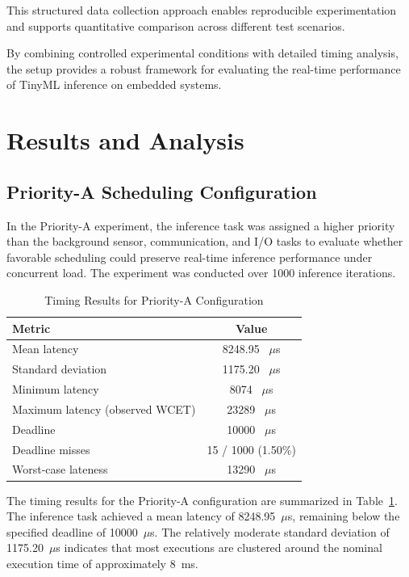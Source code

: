 \documentclass[conference]{IEEEtran}
\begin{document}
This structured data collection approach enables reproducible experimentation and supports quantitative comparison across different test scenarios.

By combining controlled experimental conditions with detailed timing analysis, the setup provides a robust framework for evaluating the real-time performance of TinyML inference on embedded systems.
\section{Results and Analysis}

\subsection{Priority-A Scheduling Configuration}

In the Priority-A experiment, the inference task was assigned a higher priority than the background sensor, communication, and I/O tasks to evaluate whether favorable scheduling could preserve real-time inference performance under concurrent load. The experiment was conducted over 1000 inference iterations.

\begin{table}[h]
\centering
\caption{Timing Results for Priority-A Configuration}
\label{tab:priority_a}
\begin{tabular}{l c}
\hline
\textbf{Metric} & \textbf{Value} \\
\hline
Mean latency & 8248.95 ~$\mu$s \\
Standard deviation & 1175.20 ~$\mu$s \\
Minimum latency & 8074 ~$\mu$s \\
Maximum latency (observed WCET) & 23289 ~$\mu$s \\
Deadline & 10000 ~$\mu$s \\
Deadline misses & 15 / 1000 (1.50\%) \\
Worst-case lateness & 13290 ~$\mu$s \\
\hline
\end{tabular}
\end{table}

The timing results for the Priority-A configuration are summarized in Table~\ref{tab:priority_a}. The inference task achieved a mean latency of 8248.95~$\mu$s, remaining below the specified deadline of 10000~$\mu$s. The relatively moderate standard deviation of 1175.20~$\mu$s indicates that most executions are clustered around the nominal execution time of approximately 8~ms.
\end{document}
